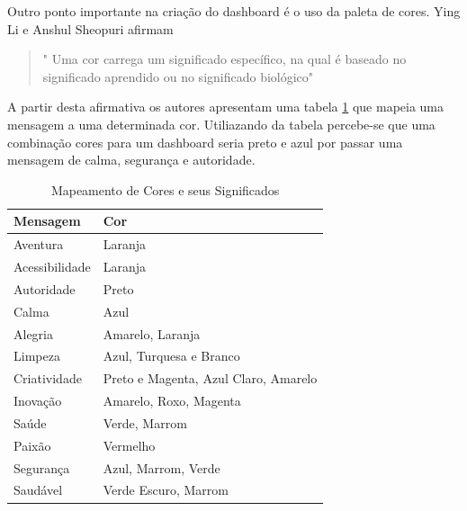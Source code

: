 Outro ponto importante na criação do dashboard é o uso da paleta de cores. Ying Li e Anshul Sheopuri \cite{li_creative_2015} afirmam 
\begin{quote}
" Uma cor carrega um significado específico, na qual é baseado no significado aprendido ou no significado biológico"
\end{quote}
 A partir desta afirmativa os autores apresentam uma tabela \ref{table:cor_significado} que mapeia uma mensagem a uma determinada cor. Utiliazando da tabela percebe-se que uma combinação cores para um dashboard seria preto e azul por passar uma mensagem de calma, segurança e autoridade.
\begin{table}[h]
\centering
\caption{Mapeamento de Cores e seus Significados}
\label{table:cor_significado}
\begin{tabular}{|ll|}
\hline
\textbf{Mensagem} & \textbf{Cor}                         \\ \hline
Aventura          & Laranja                              \\ \hline
Acessibilidade    & Laranja                              \\ \hline
Autoridade        & Preto                                \\ \hline
Calma             & Azul                                 \\ \hline
Alegria           & Amarelo, Laranja                     \\ \hline
Limpeza           & Azul, Turquesa e Branco              \\ \hline
Criatividade      & Preto e Magenta, Azul Claro, Amarelo \\ \hline
Inovação          & Amarelo, Roxo, Magenta               \\ \hline
Saúde             & Verde, Marrom                        \\ \hline
Paixão            & Vermelho                             \\ \hline
Segurança         & Azul, Marrom, Verde                  \\ \hline
Saudável          & Verde Escuro, Marrom                 \\ \hline
\end{tabular}
\end{table}

